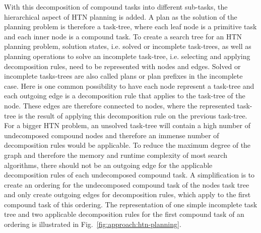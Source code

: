 With this decomposition of compound tasks into different sub-tasks, the hierarchical aspect of HTN planning is added.
A plan as the solution of the planning problem is therefore a task-tree, where each leaf node is a primitive task and each inner node is a compound task.
To create a search tree for an HTN planning problem, solution states, i.e. solved or incomplete task-trees, as well as planning operations to solve an incomplete task-tree, i.e. selecting and applying decomposition rules, need to be represented with nodes and edges.
Solved or incomplete tasks-trees are also called plans or plan prefixes in the incomplete case.\newline
Here is one common possibility to have each node represent a task-tree and each outgoing edge is a decomposition rule that applies to the task-tree of the node.
These edges are therefore connected to nodes, where the represented task-tree is the result of applying this decomposition rule on the previous task-tree.
For a bigger HTN problem, an unsolved task-tree will contain a high number of undecomposed compound nodes and therefore an immense number of decomposition rules would be applicable.
To reduce the maximum degree of the graph and therefore the memory and runtime complexity of most search algorithms, there should not be an outgoing edge for the applicable decomposition rules of each undecomposed compound task.
A simplification is to create an ordering for the undecomposed compound task of the nodes task tree and only create outgoing edges for decomposition rules, which apply to the first compound task of this ordering.
The representation of one simple incomplete task tree and two applicable decomposition rules for the first compound task of an ordering is illustrated in Fig.~\ref{fig:approach:htn-planning}.
